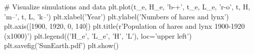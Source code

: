 \documentclass[%
oneside,                 %
final,                   %
10pt]{article}
\begin{document}
# Visualize simulations and data
plt.plot(t_e, H_e, 'b-+', t_e, L_e, 'r-o', t, H, 'm--', t, L, 'k--')
plt.xlabel('Year')
plt.ylabel('Numbers of hares and lynx')
plt.axis([1900, 1920, 0, 140])
plt.title(r'Population of hares and lynx 1900-1920 (x1000)')
plt.legend(('H_e', 'L_e', 'H', 'L'), loc='upper left')
plt.savefig('SunEarth.pdf')
plt.show()

\epycod









\end{document}
